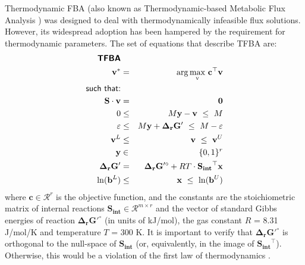 \documentclass[twocolumn]{article}
\newcommand{\Sint}{\mathbf{S_{int}}}
\begin{document}
Thermodynamic FBA (also known as Thermo\-dynamic-based Metabolic Flux Analysis \cite{Henry2007-xp}) was designed to deal with thermodynamically infeasible flux solutions. However, its widespread adoption has been hampered by the requirement for thermodynamic parameters. The set of equations that describe TFBA are:
\begin{eqnarray}
\textsf{\textbf{TFBA}} && \nonumber\\
\mathbf{v^*} &=& \mathrm{arg\max_v} {~\mathbf{c}^\top\mathbf{v}}\nonumber\\
\textsf{such that:} && \nonumber\\
\mathbf{S} \cdot \mathbf{v} &=& \mathbf{0}  \label{eq:tfba1} \\
0 &\leq& M \mathbf{y} - \mathbf{v} ~\leq~ M
\label{eq:tfba2} \\
\varepsilon &\leq& M \mathbf{y} + \mathbf{\Delta_r G'} ~\leq~ M - \varepsilon \label{eq:tfba3} \\
\mathbf{v}^L &\leq& \mathbf{v} ~\leq~ \mathbf{v}^U \label{eq:tfba4}\\
\mathbf{y} &\in& \{0, 1\}^r \label{eq:tfba5}\\
\mathbf{\Delta_r G'} &=& \mathbf{\Delta_r G'^\circ} + RT \cdot \Sint^\top \mathbf{x} \label{eq:tfba6}\\
\ln(\mathbf{b}^L) &\leq& \mathbf{x} ~\leq~ \ln(\mathbf{b}^U) \label{eq:tfba7}
\end{eqnarray}
where $\mathbf{c} \in \mathcal{R}^r$ is the objective function, and the constants are the stoichiometric matrix of internal reactions $\Sint \in \mathcal{R}^{m \times r}$  and the vector of standard Gibbs energies of reaction $\mathbf{\Delta_r G'^\circ}$ (in units of kJ/mol), the gas constant $R$ = 8.31 J/mol/K and temperature $T$ = 300 K. It is important to verify that $\mathbf{\Delta_r G'^\circ}$ is orthogonal to the null-space of $\mathbf{S_{int}}$ (or, equivalently, in the image of $\mathbf{S_{int}}^\top$). Otherwise, this would be a violation of the first law of thermodynamics \cite{Noor2012-mp}.
\end{document}
